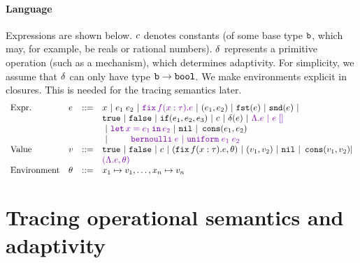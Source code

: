 \documentclass[a4paper,11pt]{article}
\newcommand{\wq}[1]{\textcolor[rgb]{.50,0.0,0.7}{ #1}}
\theoremstyle{definition}
\begin{document}
\paragraph{Language}
Expressions are shown below. $c$ denotes constants (of some base
type $\mathtt{b}$, which may, for example, be reals or rational
numbers). $\delta$ represents a primitive operation (such as a
mechanism), which determines adaptivity. For simplicity, we assume
that $\delta$ can only have type $\mathtt{b} \to \mathtt{bool}$. We make
environments explicit in closures. This is needed for the tracing
semantics later.
\[\begin{array}{llll}
\mbox{Expr.} & \expr & ::= & x ~|~ \expr_1 \eapp \expr_2 ~|~ \wq{\efix f(x:\type).\expr}
 ~|~ (\expr_1, \expr_2) ~|~ \eprojl(\expr) ~|~ \eprojr(\expr) ~| \\
%
& & & \etrue ~|~ \efalse ~|~ \eif(\expr_1, \expr_2, \expr_3) ~|~
\econst ~|~ \eop(\expr)  ~|~ \wq {\eilam \expr ~|~ \expr \eapp [] } \\
& & & ~|~ \wq {\elet  x = \expr_1 \ein \expr_2 } ~|~ \enil ~|~  \econs (
      \expr_1, \expr_2) \\
& & & ~|~ \wq{ ~~~~~~~
 \bernoulli \eapp \expr ~|~ \uniform \eapp \expr_1 \eapp
      \expr_2 } \\
%
\mbox{Value} & \valr & ::= & \etrue ~|~ \efalse ~|~ \econst ~|~
(\efix f(x:\type).\expr, \env) ~|~ (\valr_1, \valr_2) 
    ~|~ \enil ~|~ \econs (\valr_1, \valr_2) | \\
& & & \wq {(\eilam \expr , \env) } \\ 
%
\mbox{Environment} & \env & ::= & x_1 \mapsto \valr_1, \ldots, x_n \mapsto \valr_n
\end{array}\]





\section{Tracing operational semantics and adaptivity}
\end{document}
